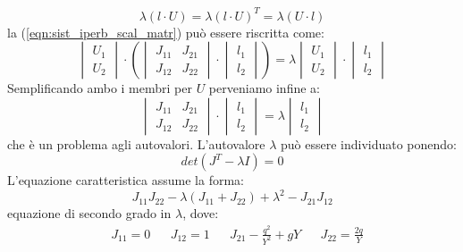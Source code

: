 \documentclass[12pt]{article} %
\begin{document}
\begin{equation}
    \lambda \left(l \cdot U\right)=\lambda \left(l \cdot U \right)^T=\lambda \left(U \cdot l \right)
\end{equation}
\noindent la (\ref{eqn:sist_iperb_scal_matr}) può essere riscritta come:
\begin{equation}
    \begin{vmatrix}U_1 \\ U_2\end{vmatrix}\cdot\left(
    \begin{vmatrix}J_{11}&J_{21}\\J_{12}&J_{22}\end{vmatrix}\cdot\begin{vmatrix}l_1\\l_2\end{vmatrix}\right) =\lambda\begin{vmatrix}U_1 \\ U_2\end{vmatrix}\cdot\begin{vmatrix}l_1\\l_2\end{vmatrix}
\end{equation}
\noindent Semplificando ambo i membri per $U$ perveniamo infine a:
\begin{equation}
    \begin{vmatrix}J_{11}&J_{21}\\J_{12}&J_{22}\end{vmatrix}\cdot\begin{vmatrix}l_1\\l_2\end{vmatrix} =\lambda\begin{vmatrix}l_1 \\ l_2\end{vmatrix}
    \label{eqn:problema_autovalori}
\end{equation}
\noindent che è un problema agli autovalori. L'autovalore $\lambda$ può essere individuato ponendo:
\begin{equation}
    det\left(J^T-\lambda I\right) = 0
    \label{eqn:problema_autovalori}
\end{equation}
\noindent L'equazione caratteristica assume la forma:
\begin{equation}
    J_{11}J_{22}-\lambda(J_{11}+J_{22})+\lambda^2-J_{21}J_{12}
\end{equation}
\noindent equazione di secondo grado in $\lambda$, dove:
\begin{align*}
    &J_{11}=0 & &J_{12}=1 & &J_{21}-\frac{q^2}{Y^2}+gY & &J_{22}=\frac{2q}{Y}
\end{align*}
\end{document}
